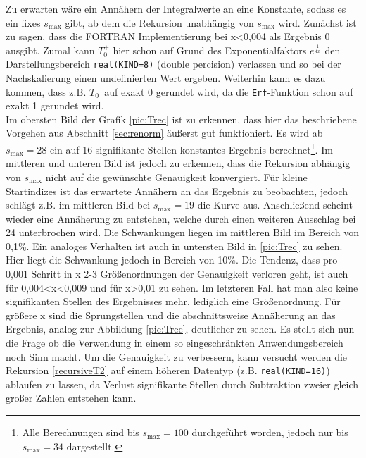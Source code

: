 Zu erwarten wäre ein Annähern der Integralwerte an eine 
Konstante, sodass es ein fixes $s_\text{max}$ gibt, ab dem die Rekursion 
unabhängig von $s_\text{max}$ wird. 
Zunächst ist zu sagen, dass die FORTRAN Implementierung bei x<0,004 als 
Ergebnis 0 ausgibt. Zumal kann $T_0^+$ hier schon auf Grund des 
Exponentialfaktors $e^{\frac{1}{4x}}$ den Darstellungsbereich 
\texttt{real(KIND=8)} (double percision) verlassen und so bei der 
Nachskalierung einen undefinierten Wert ergeben. Weiterhin kann es dazu kommen, 
dass z.B. $T_0^-$ auf exakt 0 gerundet wird, da die \texttt{Erf}-Funktion schon 
auf exakt 1 gerundet wird. \\
Im obersten Bild der Grafik \ref{pic:Trec} ist zu erkennen, dass hier das 
beschriebene Vorgehen aus Abschnitt \ref{sec:renorm} äußerst gut funktioniert. 
Es wird ab $s_\text{max}=28$ ein auf 16 signifikante Stellen konstantes 
Ergebnis berechnet\footnote{Alle Berechnungen sind bis $s_\text{max}=100$ 
durchgeführt worden, jedoch nur bis $s_\text{max}=34$ dargestellt.}. Im 
mittleren und unteren Bild ist jedoch zu erkennen, dass die Rekursion abhängig 
von $s_\text{max}$ nicht auf die gewünschte Genauigkeit konvergiert. Für kleine 
Startindizes ist das erwartete Annähern an das Ergebnis zu beobachten, jedoch 
schlägt z.B. im mittleren Bild bei $s_\text{max}=19$ die Kurve aus. 
Anschließend scheint wieder eine Annäherung zu entstehen, welche durch einen 
weiteren Ausschlag bei 24 unterbrochen wird. Die Schwankungen liegen im 
mittleren Bild im Bereich von 0,1\%. Ein analoges Verhalten ist auch in 
untersten Bild in \ref{pic:Trec} zu sehen. Hier liegt die Schwankung jedoch in 
Bereich von 10\%. Die Tendenz, dass pro 0,001 Schritt in x 2-3 Größenordnungen 
der Genauigkeit verloren geht, ist auch für 0,004<x<0,009 und für x>0,01 zu 
sehen. Im letzteren Fall hat man also keine signifikanten Stellen des 
Ergebnisses mehr, lediglich eine Größenordnung. Für größere x sind die 
Sprungstellen und die abschnittsweise Annäherung an das Ergebnis, analog zur 
Abbildung \ref{pic:Trec}, deutlicher zu sehen.  Es stellt sich nun die Frage ob 
die Verwendung in einem so eingeschränkten Anwendungsbereich noch Sinn macht. 
Um die Genauigkeit zu verbessern, kann versucht werden die Rekursion 
\ref{recursiveT2} auf einem höheren Datentyp (z.B. \texttt{real(KIND=16)}) 
ablaufen zu lassen, da Verlust signifikante Stellen durch Subtraktion zweier 
gleich großer Zahlen entstehen kann.
%
%
%
%
% 
%
%
